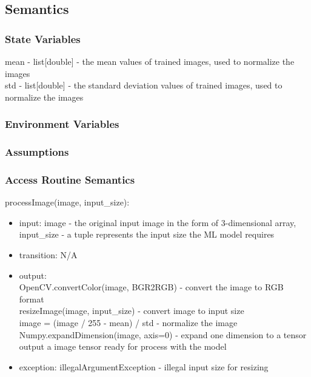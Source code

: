 \documentclass[12pt, titlepage]{article}
\begin{document}
\subsection{Semantics}

\subsubsection{State Variables}
mean - list[double] - the mean values of trained images, used to normalize the images \\
std - list[double] - the standard deviation values of trained images, used to normalize the images \\

\subsubsection{Environment Variables}

\subsubsection{Assumptions}

\subsubsection{Access Routine Semantics}
\noindent processImage(image, input\_size):
\begin{itemize}
\item input: image - the original input image in the form of 3-dimensional array, input\_size - a tuple represents the input size the ML model requires
\item transition: N/A
\item output: \\
OpenCV.convertColor(image, BGR2RGB) - convert the image to RGB format \\ resizeImage(image, input\_size) - convert image to input size \\
image = (image / 255 - mean) / std - normalize the image \\
Numpy.expandDimension(image, axis=0) - expand one dimension to a tensor \\
output a image tensor ready for process with the model
\item exception: illegalArgumentException - illegal input size for resizing
\end{itemize}
\end{document}

